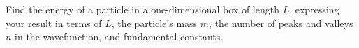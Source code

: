 Find the energy of a particle in a one-dimensional box of
length $L$, expressing your result in terms of $L$, the
particle's mass $m$, the number of peaks and valleys $n$ in
the wavefunction, and fundamental constants.\answercheck

